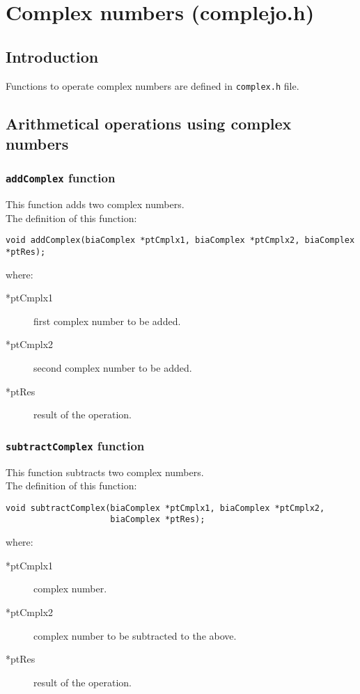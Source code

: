 %
%

\chapter{Complex numbers (complejo.h)}



\section{Introduction}

Functions to operate complex numbers are defined in \texttt{complex.h} file.\\


\section{Arithmetical operations using complex numbers}

\subsection{\texttt{addComplex} function}

This function adds two complex numbers.\\

The definition of this function:
%
\begin{verbatim}
void addComplex(biaComplex *ptCmplx1, biaComplex *ptCmplx2, biaComplex *ptRes);
\end{verbatim}
%
where:
%
\begin{description}
\item[*ptCmplx1] first complex number to be added.
\item[*ptCmplx2] second complex number to be added.
\item[*ptRes] result of the operation.
\end{description}

\subsection{\texttt{subtractComplex} function}

This function subtracts two complex numbers.\\

The definition of this function:
%
\begin{verbatim}
void subtractComplex(biaComplex *ptCmplx1, biaComplex *ptCmplx2, 
                     biaComplex *ptRes);  
\end{verbatim}
%
where:
%
\begin{description}
\item[*ptCmplx1] complex number.
\item[*ptCmplx2] complex number to be subtracted to the above.
\item[*ptRes] result of the operation.
\end{description}

